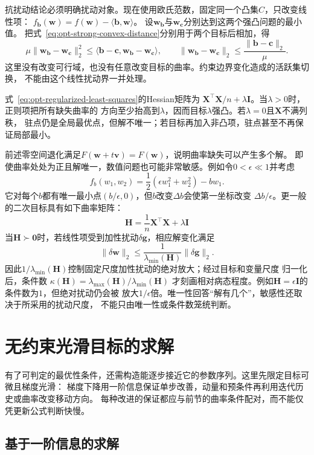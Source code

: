 抗扰动结论必须明确扰动对象。现在使用欧氏范数，固定同一个凸集$C$，只改变线性项：
$f_{\bm b}(\bm w)=f(\bm w)-\langle\bm b,\bm w\rangle$。
设$\bm w_{\bm b}$与$\bm w_{\bm c}$分别达到这两个强凸问题的最小值。
把式~\eqref{eq:opt-strong-convex-distance}分别用于两个目标后相加，得
\[
 \mu\|\bm w_{\bm b}-\bm w_{\bm c}\|_2^2
 \leq\langle\bm b-\bm c,\bm w_{\bm b}-\bm w_{\bm c}\rangle,
 \qquad
 \|\bm w_{\bm b}-\bm w_{\bm c}\|_2\leq\frac{\|\bm b-\bm c\|_2}{\mu}.
\]
这里没有改变可行域，也没有任意改变目标的曲率。约束边界变化造成的活跃集切换，
不能由这个线性扰动界一并处理。

式~\eqref{eq:opt-regularized-least-squares}的Hessian矩阵为
$\bm{X}^{\top}\bm{X}/n+\lambda\bm{I}$。当$\lambda>0$时，正则项把所有缺失曲率的
方向至少抬高到$\lambda$，因而目标$\lambda$强凸。若$\lambda=0$且$\bm{X}$不满列秩，
驻点仍是全局最优点，但解不唯一；若目标再加入非凸项，驻点甚至不再保证局部最小。

前述零空间退化满足$F(\bm w+t\bm v)=F(\bm w)$，说明曲率缺失可以产生多个解。
即使曲率处处为正且解唯一，数值问题也可能非常敏感。例如令$0<\epsilon\ll1$并考虑
\[
  f_b(w_1,w_2)=\frac12(\epsilon w_1^2+w_2^2)-bw_1.
\]
它对每个$b$都有唯一最小点$(b/\epsilon,0)$，但$b$改变$\Delta b$会使第一坐标改变
$\Delta b/\epsilon$。更一般的二次目标具有如下曲率矩阵：
\[
  \bm{H}=\frac{1}{n}\bm{X}^{\top}\bm{X}+\lambda\bm{I}
\]
当$\bm{H}\succ\bm{0}$时，若线性项受到加性扰动$\delta\bm{g}$，相应解变化满足
\[
  \lVert\delta\bm{w}\rVert_2
  \leq
  \frac{1}{\lambda_{\min}(\bm{H})}
  \lVert\delta\bm{g}\rVert_2.
\]
因此$1/\lambda_{\min}(\bm{H})$控制固定尺度加性扰动的绝对放大；经过目标和变量尺度
归一化后，条件数
$\kappa(\bm{H})=\lambda_{\max}(\bm{H})/\lambda_{\min}(\bm{H})$
才刻画相对病态程度。例如$\bm{H}=\epsilon\bm{I}$的条件数为$1$，但绝对扰动仍会被
放大$1/\epsilon$倍。唯一性回答“解有几个”，敏感性还取决于所采用的扰动尺度，
不能只由唯一性或条件数笼统判断。

\section{无约束光滑目标的求解}
\label{sec:opt-smooth-iterative-methods}

有了可判定的最优性条件，还需构造能逐步接近它的参数序列。这里先限定目标可微且梯度光滑：
梯度下降用一阶信息保证单步改善，动量和预条件再利用迭代历史或曲率改变移动方向。
每种改进的保证都应与前节的曲率条件配对，而不能仅凭更新公式判断快慢。

\subsection{基于一阶信息的求解}
\label{sec:opt-first-order-methods}

